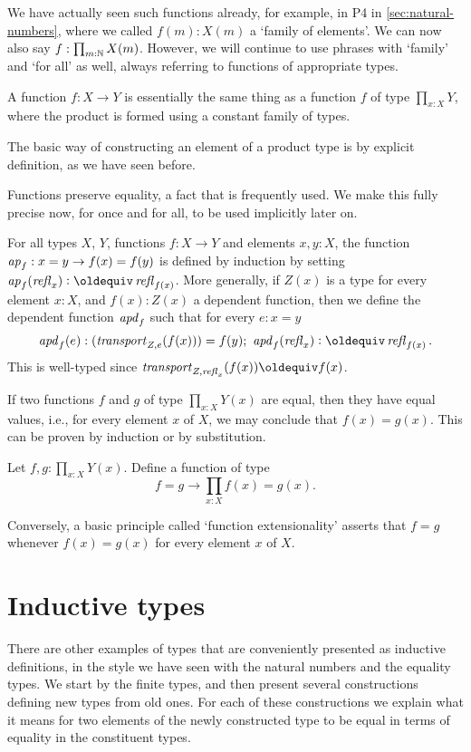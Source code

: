 We have actually seen such functions already, for example,
in P4 in \cref{sec:natural-numbers}, where
we called $f(m):X(m)$ a `family of elements'. We can now
also say $f: \prod_{m:\mathbb{N}} X(m)$. However, we will continue to use
phrases with `family' and `for all' as well, always referring to functions
of appropriate types.

A function $f : X \to Y$ is essentially the same thing as a function $f$ 
of type $\prod_{x:X} Y$, where the product is formed using a constant family of types.

The basic way of constructing an element of a product type
is by explicit definition, as we have seen before.

Functions preserve equality, a fact that is frequently used.
We make this fully precise now, for once and for all, 
to be used implicitly later on.

\begin{definition}\label{def:apd}
For all types $X$, $Y$, functions $f:X\to Y$ and elements $x,y:X$, the function
$\mathop{{\it ap}_{f}} : x = y \to f(x) = f(y)$ is defined by induction by setting 
$\ap{f}(\refl{x})\defeq\refl{f(x)}$. More generally, 
if $Z(x)$ is a type for every element $x:X$, and $f(x):Z(x)$
a dependent function, then we define the dependent function
$\mathop{{\it apd}_{f}}$ such that for every $e:x=y$
\[
 \apd{f}(e): (\trp_{Z,e}(f(x))) = f(y);~\apd{f}(\refl{x})\defeq\refl{f(x)}.
\]
This is well-typed since $\trp_{Z,\refl{x}}(f(x)) \jdeq f(x)$. 
\end{definition}

If two functions $f$ and $g$ of type $\prod_{x:X} Y(x)$ are equal, 
then they have equal values, i.e., for every element $x$ of $X$, 
we may conclude that $f(x) = g(x)$.
This can be proven by induction or by substitution.
\begin{xca}\label{happly}
Let $f,g:\prod_{x:X} Y(x)$. Define a function of type 
\[ 
f=g \to \prod_{x:X} f(x)=g(x).
\] 
\end{xca}

Conversely, a basic principle called `function extensionality'
asserts that $f=g$ whenever $f(x) = g(x)$ for every element $x$ of $X$.

\section{Inductive types}
\label{sec:inductive-types}

There are other examples of types that are conveniently presented as 
inductive definitions, in the style we have seen with the natural numbers
and the equality types.  We start by the finite types, and then
present several constructions defining new types from old ones.
For each of these constructions we explain what it means for two 
elements of the newly constructed type to be equal in terms of
equality in the constituent types.

